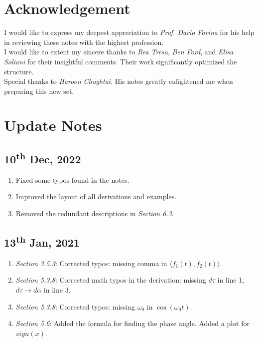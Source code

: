 \section*{Acknowledgement}
I would like to express my deepest appreciation to \emph{Prof. Dario Farina} for his help in reviewing these notes with the highest profession. \\

I would like to extent my sincere thanks to \emph{Rea Tresa}, \emph{Ben Ford}, and \emph{Elisa Soliani} for their insightful comments. Their work significantly optimized the structure. \\

Special thanks to \emph{Haroon Chughtai}. His notes greatly enlightened me when preparing this new set.

\section*{Update Notes}
\subsection*{10\textsuperscript{th} Dec, 2022}
\begin{enumerate}
    \item Fixed some typos found in the notes.
    \item Improved the layout of all derivations and examples.
    \item Removed the redundant descriptions in \textit{Section 6.3}.
\end{enumerate}
\subsection*{13\textsuperscript{th} Jan, 2021}
\begin{enumerate}
    \item  \emph{Section 3.5.3}: Corrected typos: missing comma in $\langle f_{1}(t), f_{2}(t) \rangle$.
    \item \emph{Section 5.3.8}: Corrected math typos in the derivation: missing $d\tau$ in line 1, $d\tau \to d\alpha$ in line 3.
    \item \emph{Section 5.3.8}: Corrected typos: missing $\omega_{0}$ in $\cos(\omega_{0} t)$.
    \item \emph{Section 5.6}: Added the formula for finding the phase angle. Added a plot for $sign(x)$.
\end{enumerate}
